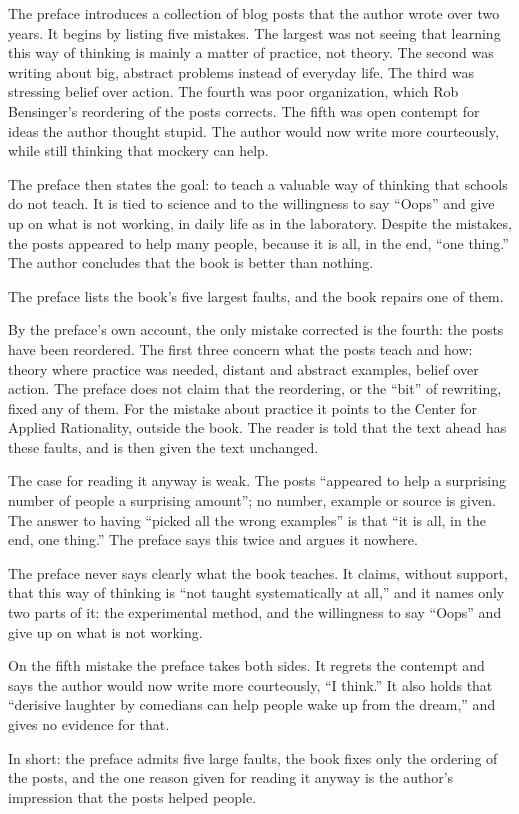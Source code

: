 \begin{afterword}
\summaryhead

The preface introduces a collection of blog posts that the author wrote over two years. It begins by listing five mistakes. The largest was not seeing that learning this way of thinking is mainly a matter of practice, not theory. The second was writing about big, abstract problems instead of everyday life. The third was stressing belief over action. The fourth was poor organization, which Rob Bensinger's reordering of the posts corrects. The fifth was open contempt for ideas the author thought stupid. The author would now write more courteously, while still thinking that mockery can help.

The preface then states the goal: to teach a valuable way of thinking that schools do not teach. It is tied to science and to the willingness to say ``Oops'' and give up on what is not working, in daily life as in the laboratory. Despite the mistakes, the posts appeared to help many people, because it is all, in the end, ``one thing.'' The author concludes that the book is better than nothing.

\responsehead

The preface lists the book's five largest faults, and the book repairs one of them.

By the preface's own account, the only mistake corrected is the fourth: the posts have been reordered. The first three concern what the posts teach and how: theory where practice was needed, distant and abstract examples, belief over action. The preface does not claim that the reordering, or the ``bit'' of rewriting, fixed any of them. For the mistake about practice it points to the Center for Applied Rationality, outside the book. The reader is told that the text ahead has these faults, and is then given the text unchanged.

The case for reading it anyway is weak. The posts ``appeared to help a surprising number of people a surprising amount''; no number, example or source is given. The answer to having ``picked all the wrong examples'' is that ``it is all, in the end, one thing.'' The preface says this twice and argues it nowhere.

The preface never says clearly what the book teaches. It claims, without support, that this way of thinking is ``not taught systematically at all,'' and it names only two parts of it: the experimental method, and the willingness to say ``Oops'' and give up on what is not working.

On the fifth mistake the preface takes both sides. It regrets the contempt and says the author would now write more courteously, ``I think.'' It also holds that ``derisive laughter by comedians can help people wake up from the dream,'' and gives no evidence for that.

In short: the preface admits five large faults, the book fixes only the ordering of the posts, and the one reason given for reading it anyway is the author's impression that the posts helped people.
\end{afterword}
